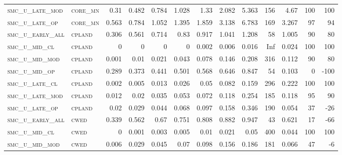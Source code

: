 \begin{landscape}
\begin{center}
\begin{footnotesize}
\begin{longtable}{llrrrrrrrr|rrr}
\textsc{smc\_u\_late\_mod } & \textsc{core\_mn  }   & 0.31     & 0.482    & 0.784    & 1.028    & 1.33     & 2.082    & 5.363     & 156    & 4.67          & 100           & 100             \\
\textsc{smc\_u\_late\_op  } & \textsc{core\_mn  }   & 0.563    & 0.784    & 1.052    & 1.395    & 1.859    & 3.138    & 6.783     & 169    & 3.267         & 97            & 94              \\
\textsc{smc\_u\_early\_all} & \textsc{cpland    }   & 0.306    & 0.561    & 0.714    & 0.83     & 0.917    & 1.041    & 1.208     & 58     & 1.005         & 90            & 80              \\
\textsc{smc\_u\_mid\_cl   } & \textsc{cpland    }   & 0        & 0        & 0        & 0        & 0.002    & 0.006    & 0.016     & Inf    & 0.024         & 100           & 100             \\
\textsc{smc\_u\_mid\_mod  } & \textsc{cpland    }   & 0.001    & 0.01     & 0.021    & 0.043    & 0.078    & 0.146    & 0.208     & 316    & 0.112         & 90            & 80              \\
\textsc{smc\_u\_mid\_op   } & \textsc{cpland    }   & 0.289    & 0.373    & 0.441    & 0.501    & 0.568    & 0.646    & 0.847     & 54     & 0.103         & 0             & -100            \\
\textsc{smc\_u\_late\_cl  } & \textsc{cpland    }   & 0.002    & 0.005    & 0.013    & 0.026    & 0.05     & 0.082    & 0.159     & 296    & 0.222         & 100           & 100             \\
\textsc{smc\_u\_late\_mod } & \textsc{cpland    }   & 0.012    & 0.02     & 0.035    & 0.053    & 0.072    & 0.118    & 0.254     & 185    & 0.118         & 95            & 90              \\
\textsc{smc\_u\_late\_op  } & \textsc{cpland    }   & 0.02     & 0.029    & 0.044    & 0.068    & 0.097    & 0.158    & 0.346     & 190    & 0.054         & 37            & -26             \\
\textsc{smc\_u\_early\_all} & \textsc{cwed      }   & 0.339    & 0.562    & 0.67     & 0.751    & 0.808    & 0.882    & 0.947     & 43     & 0.621         & 17            & -66             \\
\textsc{smc\_u\_mid\_cl   } & \textsc{cwed      }   & 0        & 0.001    & 0.003    & 0.005    & 0.01     & 0.021    & 0.05      & 400    & 0.044         & 100           & 100             \\
\textsc{smc\_u\_mid\_mod  } & \textsc{cwed      }   & 0.006    & 0.029    & 0.045    & 0.07     & 0.098    & 0.156    & 0.186     & 181    & 0.066         & 47            & -6              \\

\end{longtable}
\end{footnotesize}
\end{center}
\end{landscape}
